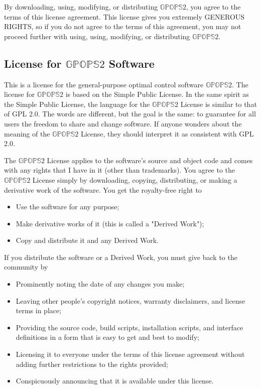 By downloading, using, modifying, or distributing $\mathbb{GPOPS}2$, you agree to 
the terms of this license agreement.  This license gives you extremely
GENEROUS RIGHTS, so if you do not agree to the terms of this
agreement, you may not proceed further with using, using, modifying,
or distributing $\mathbb{GPOPS}2$.  

\subsection*{License for $\mathbb{GPOPS}2$ Software}

This is a license for the general-purpose optimal control software
$\mathbb{GPOPS}2$.  The license for $\mathbb{GPOPS}2$ is based on the Simple Public
License.  In the same spirit as the Simple Public 
License, the language for the $\mathbb{GPOPS}2$ License is similar to that
of GPL 2.0.  The words are different, but the goal is the same:  
to guarantee for all users the freedom to share and change       
software.  If anyone wonders about the meaning of the $\mathbb{GPOPS}2$ 
License, they should interpret it as consistent with GPL 2.0.    
                                                                 
The $\mathbb{GPOPS}2$ License applies to the software's source and object    
code and comes with any rights that I have in it (other than     
trademarks). You agree to the $\mathbb{GPOPS}2$ License simply by            
downloading, copying, distributing, or making a derivative work  
of the software.  You get the royalty-free right to
\begin{itemize}
\item Use the software for any purpose;
\item Make derivative works of it (this is called a "Derived Work");                                            
\item Copy and distribute it and any Derived Work.
\end{itemize}
If you distribute the software or a Derived Work, you must give back
to the community by
\begin{itemize} 
\item Prominently noting the date of any changes you make;       
\item Leaving other people's copyright notices, warranty disclaimers,
and license terms in place;
\item Providing the source code, build scripts, installation scripts,
and interface definitions in a form that is easy to get and best to
modify;
\item Licensing it to everyone under the terms of this license
agreement without adding further restrictions to the rights provided;
\item Conspicuously announcing that it is available under this
license.
\end{itemize}

